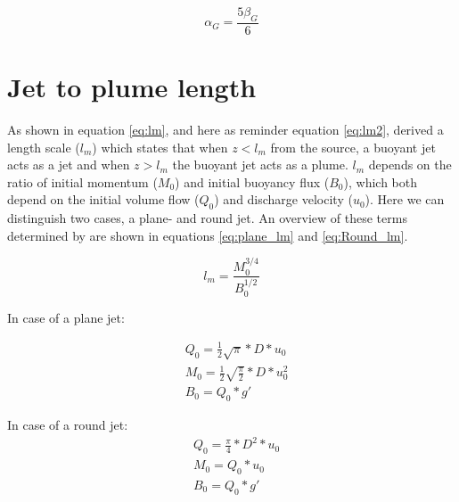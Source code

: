 \begin{equation}
    \alpha_G = \frac{5\beta_G}{6}
\end{equation}




\section{Jet to plume length}
As shown in equation \ref{eq:lm}, and here as reminder equation \ref{eq:lm2}, \cite{Fischer+} derived a length scale ($l_m$) which states that when $z < l_m$ from the source, a buoyant jet acts as a jet and when $z > l_m$ the buoyant jet acts as a plume. $l_m$ depends on the ratio of initial momentum ($M_0$) and initial buoyancy flux ($B_0$), which both depend on the initial volume flow ($Q_0$) and discharge velocity ($u_0$). Here we can distinguish two cases, a plane- and round jet. An overview of these terms determined by \cite{Lee+} are shown in equations \ref{eq:plane_lm} and \ref{eq:Round_lm}.\newline 

\begin{equation}
\label{eq:lm2}
 l_m = \frac{M_0^{3/4}}{B_{0}^{1/2}}
\end{equation}


\noindent In case of a plane jet:

\begin{equation}
\begin{split}
    & Q_0 =  \frac{1}{2}\sqrt{\pi} *D* u_0 \\
    & M_0 = \frac{1}{2}\sqrt{\frac{\pi}{2}}* D *u_0^2 \\
    & B_0 = Q_0 * g'
  \end{split}  
  \label{eq:plane_lm}
\end{equation}

\noindent In case of a round jet:
\begin{equation}
\begin{split}
    & Q_0 =\frac{\pi}{4} * D^2 * u_0 \\
    & M_0 = Q_0* u_0 \\
    & B_0 = Q_0* g'
  \end{split}  
  \label{eq:Round_lm}
\end{equation}

